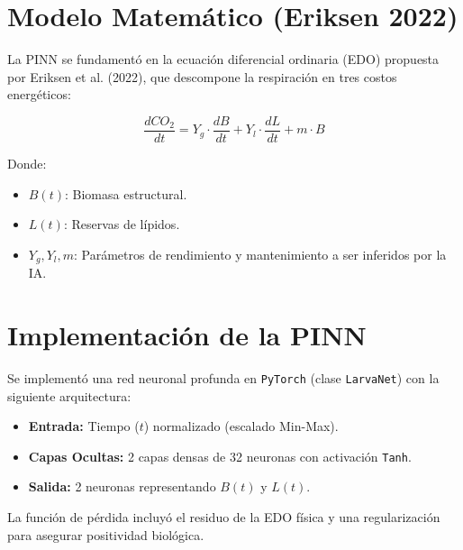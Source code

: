 \section{Modelo Matemático (Eriksen 2022)}
La PINN se fundamentó en la ecuación diferencial ordinaria (EDO) propuesta por Eriksen et al. (2022), que descompone la respiración en tres costos energéticos:

\begin{equation}
    \frac{dCO_2}{dt} = Y_g \cdot \frac{dB}{dt} + Y_l \cdot \frac{dL}{dt} + m \cdot B
\end{equation}

Donde:
\begin{itemize}
    \item $B(t)$: Biomasa estructural.
    \item $L(t)$: Reservas de lípidos.
    \item $Y_g, Y_l, m$: Parámetros de rendimiento y mantenimiento a ser inferidos por la IA.
\end{itemize}

\section{Implementación de la PINN}
Se implementó una red neuronal profunda en \texttt{PyTorch} (clase \texttt{LarvaNet}) con la siguiente arquitectura:
\begin{itemize}
    \item \textbf{Entrada:} Tiempo ($t$) normalizado (escalado Min-Max).
    \item \textbf{Capas Ocultas:} 2 capas densas de 32 neuronas con activación \texttt{Tanh}.
    \item \textbf{Salida:} 2 neuronas representando $B(t)$ y $L(t)$.
\end{itemize}

La función de pérdida incluyó el residuo de la EDO física y una regularización para asegurar positividad biológica.
